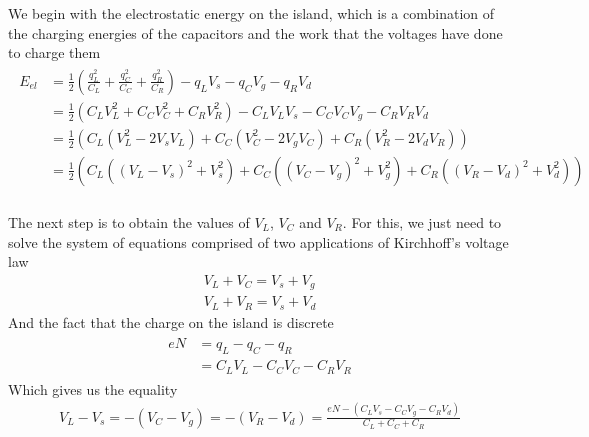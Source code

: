 \documentclass[../main.tex]{subfiles}
\begin{document}
We begin with the electrostatic energy on the island, which is a combination
of the charging energies of the capacitors and the work that the voltages have
done to charge them
\begin{align*}
\begin{split}
\label{eq:InitialElecESET}
E_{el} &= \frac{1}{2}\left(\frac{q^{2}_{L}}{C_{L}} +
                           \frac{q^{2}_{C}}{C_{C}} +
                           \frac{q^{2}_{R}}{C_{R}}\right)
          - q_{L}V_{s}
          - q_{C}V_{g}
          - q_{R}V_{d}\\
       &= \frac{1}{2}\left(C_{L}V_{L}^2 +
                           C_{C}V_{C}^2 +
                           C_{R}V_{R}^2\right)
          - C_{L}V_{L}V_{s}
          - C_{C}V_{C}V_{g}
          - C_{R}V_{R}V_{d}\\
       &= \frac{1}{2}\left(C_{L}(V^2_{L} - 2V_{s}V_{L}) +
                           C_{C}(V^2_{C} - 2V_{g}V_{C}) +
                           C_{R}(V^2_{R} - 2V_{d}V_{R})\right)\\
       &= \frac{1}{2}\left(C_{L}((V_{L} - V_{s})^2 + V_{s}^2) +
                           C_{C}((V_{C} - V_{g})^2 + V_{g}^2) +
                           C_{R}((V_{R} - V_{d})^2 + V_{d}^2)\right)\\
\end{split}
\end{align*}

The next step is to obtain the values of \(V_{L}\), \(V_{C}\) and \(V_{R}\).
For this, we just need to solve the system of equations comprised of two
applications of Kirchhoff's voltage law
\begin{align*}
    V_{L} + V_{C} = V_{s} + V_{g}\\
    V_{L} + V_{R} = V_{s} + V_{d}
\end{align*}
And the fact that the charge on the island is discrete
\begin{align*}
\begin{split}
    eN &= q_{L} - q_{C} - q_{R}\\
       &= C_{L}V_{L} - C_{C}V_{C} - C_{R}V_{R}
\end{split}
\end{align*}
Which gives us the equality
\begin{align*}
    V_{L} - V_{s} = -(V_{C} - V_{g})
                  = -(V_{R} - V_{d})
                  = \frac{eN - (C_{L}V_{s} - C_{C}V_{g} - C_{R}V_{d})}{C_{L} + C_{C} + C_{R}}
\end{align*}
\end{document}
